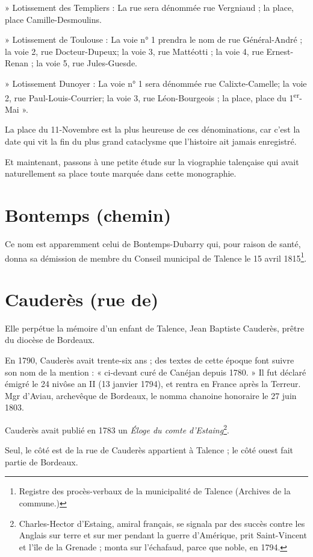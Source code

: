 \documentclass[a4paper,11pt]{book}
\begin{document}
» Lotissement des Templiers : La rue sera dénommée rue Vergniaud ; la place, place Camille-Desmoulins.

» Lotissement de Toulouse : La voie n° 1 prendra le nom de rue Général-André ; la voie 2, rue Docteur-Dupeux; la voie 3, rue Mattéotti ; la voie 4, rue Ernest-Renan ; la voie
5, rue Jules-Guesde.

» Lotissement Dunoyer : La voie n° 1 sera dénommée rue Calixte-Camelle; la voie 2, rue Paul-Louis-Courrier; la voie 3, rue Léon-Bourgeois ; la place, place du 1\textsuperscript{er}-Mai ».

La place du 11-Novembre est la plus heureuse de ces dénominations, car c'est la date qui vit la fin du plus grand cataclysme que l'histoire ait jamais enregistré.

Et maintenant, passons à une petite étude sur la viographie talençaise qui avait naturellement sa place toute marquée dans cette monographie.

\section{Bontemps (chemin)}
Ce nom est apparemment celui de Bontemps-Dubarry qui, pour raison de santé, donna sa démission de membre du Conseil municipal de Talence le 15 avril 1815\footnote{Registre des procès-verbaux de la municipalité de Talence (Archives de la commune.)}.

\section{Cauderès (rue de)}

Elle perpétue la mémoire d'un enfant de Talence, Jean Baptiste Cauderès, prêtre du diocèse de Bordeaux.

En 1790, Cauderès avait trente-six ans ; des textes de cette époque font suivre son nom de la mention : « ci-devant curé de Canéjan depuis 1780. » Il fut déclaré émigré le 24 nivôse an II (13 janvier 1794), et rentra en France après la Terreur. Mgr d'Aviau, archevêque de Bordeaux, le nomma chanoine honoraire le 27 juin 1803.

Cauderès avait publié en 1783 un \textit{Éloge du comte d'Estaing}\footnote{Charles-Hector d'Estaing, amiral français, se signala par des succès contre les Anglais sur terre et sur mer pendant la guerre d'Amérique, prit Saint-Vincent et l'île de la Grenade ; monta sur l'échafaud, parce que noble, en 1794.}.

Seul, le côté est de la rue de Cauderès appartient à Talence ; le côté ouest fait partie de Bordeaux.
\end{document}
